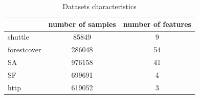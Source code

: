\documentclass[9pt]{beamer}
\def\mb{\mathbf}
\begin{document}
\begin{frame}
\begin{table}[h]
\centering
\begin{tabular}{lcc}
  \toprule
  ~           & number of samples  & number of features \\
  \midrule
  shuttle     & 85849              & 9                  \\
  forestcover & 286048             & 54                 \\
  SA          & 976158             & 41                 \\
  SF          & 699691             & 4                  \\
  http        & 619052             & 3                  \\
  \bottomrule
\end{tabular}
\caption{Datasets characteristics}
\label{table:data}


\end{table}
\end{frame}
\end{document}
